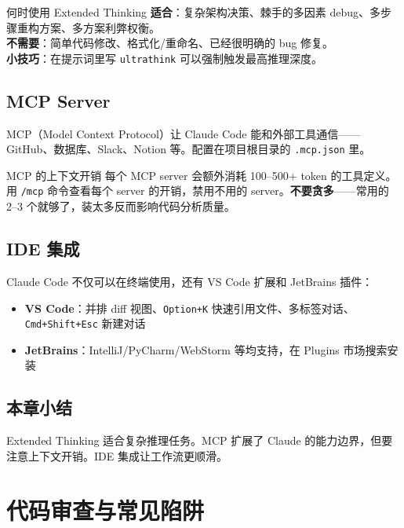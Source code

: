 \documentclass[a4paper]{article}
\begin{document}
\begin{importantbox}{何时使用 Extended Thinking}
\textbf{适合}：复杂架构决策、棘手的多因素 debug、多步骤重构方案、多方案利弊权衡。\\
\textbf{不需要}：简单代码修改、格式化/重命名、已经很明确的 bug 修复。\\
\textbf{小技巧}：在提示词里写 \texttt{ultrathink} 可以强制触发最高推理深度。
\end{importantbox}

\subsection{MCP Server}

MCP（Model Context Protocol）让 Claude Code 能和外部工具通信——GitHub、数据库、Slack、Notion 等。配置在项目根目录的 \texttt{.mcp.json} 里。

\begin{warningbox}{MCP 的上下文开销}
每个 MCP server 会额外消耗 100--500+ token 的工具定义。用 \texttt{/mcp} 命令查看每个 server 的开销，禁用不用的 server。\textbf{不要贪多}——常用的 2--3 个就够了，装太多反而影响代码分析质量。
\end{warningbox}

\subsection{IDE 集成}

Claude Code 不仅可以在终端使用，还有 VS Code 扩展和 JetBrains 插件：

\begin{itemize}[leftmargin=1.5em]
  \item \textbf{VS Code}：并排 diff 视图、\texttt{Option+K} 快速引用文件、多标签对话、\texttt{Cmd+Shift+Esc} 新建对话
  \item \textbf{JetBrains}：IntelliJ/PyCharm/WebStorm 等均支持，在 Plugins 市场搜索安装
\end{itemize}

\subsection{本章小结}

Extended Thinking 适合复杂推理任务。MCP 扩展了 Claude 的能力边界，但要注意上下文开销。IDE 集成让工作流更顺滑。

\section{代码审查与常见陷阱}
\end{document}
